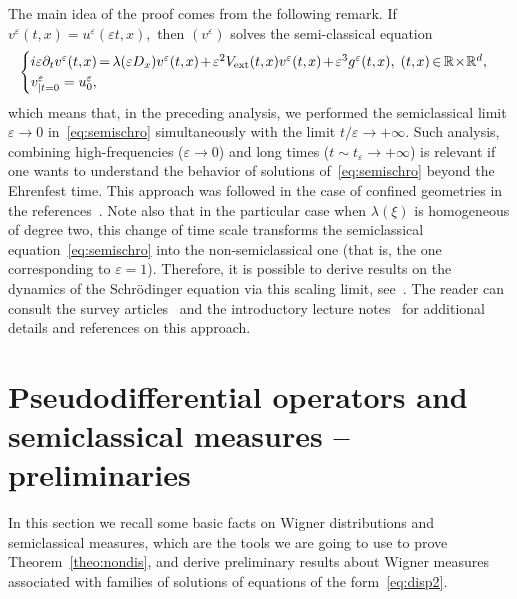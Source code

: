 \documentclass[10pt]{amsart}
\theoremstyle{definition}
\DeclareMathOperator{\ext}{ext}
\newcommand*\R{{\mathbb R}}
\newcommand*\eps{\varepsilon}
\numberwithin{equation}{section}
\newcommand*{\mk}{\mkern -1mu}
\newcommand*{\Mk}{\mkern -2mu}
\begin{document}
The main idea of the proof comes from the following remark. If~$v^\eps(t,x)= u^\eps(\eps t, x),$ then $(v^\eps)$ solves the semi-classical equation
\begin{equation}\label{eq:semischro}
\!\!\!\begin{cases}
i\eps \partial_{t} v^{\eps}(t,\mk x) \Mk=\Mk \lambda(\eps D_x) v^{\eps}(t,\mk x) \Mk+\Mk \eps^2 V_{\ext}(t,\mk x) v^{\eps}(t,\mk x)\Mk+\Mk\eps^3g^\eps(t,\mk x), \; (t,\mk x)\Mk\in\Mk\R\!\times\!\R^d,\\
v^\eps_{|t=0}=u^\eps_0,
\end{cases}\!\!\!\!
\end{equation}
which means that, in the preceding analysis, we performed the semiclassical limit $\eps\to 0$ in~\eqref{eq:semischro} simultaneously with the limit $t / \eps\to +\infty$. Such analysis, combining high-frequencies ($\eps\to 0$) and long times ($t\sim t_\eps\to +\infty$) is relevant if one wants to understand the behavior of solutions of~\eqref{eq:semischro} beyond the Ehrenfest time. This approach was followed in the case of confined geometries in the references~\cite{AFM:15,MaciaAv,MR:16}. Note also that in the particular case when $\lambda(\xi)$ is homogeneous of degree two, this change of time scale transforms the semiclassical equation~\eqref{eq:semischro} into the non-semiclassical one (that is, the one corresponding to $\eps=1$). Therefore, it is possible to derive results on the dynamics of the Schr\"odinger equation via this scaling limit, see~\cite{ALM:16,AM:14,AnRiv,MaciaTorus}. The reader can consult the survey articles~\cite{AM:12,MaciaDispersion} and the introductory lecture notes~\cite{MaciaLille} for additional details and references on this approach.


\section{Pseudodifferential operators and semiclassical measures -- preliminaries}\label{sec:semiclassical}

In this section we recall some basic facts on Wigner distributions and semiclassical measures, which are the tools we are going to use to prove Theorem~\ref{theo:nondis}, and derive preliminary results about Wigner measures associated with families of solutions of equations of the form~\eqref{eq:disp2}.
\end{document}
